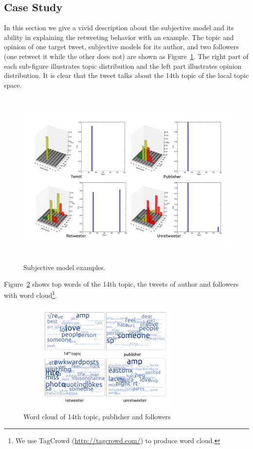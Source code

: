 \documentclass[letterpaper]{article}
\begin{document}
\subsection{Case Study}
\label{example}
In this section we give a vivid description about the subjective model and its ability in explaining the retweeting behavior with an example. 
The topic and opinion of one target tweet, subjective models for its author, and two followers (one retweet it while the other does not) are shown as Figure~\ref{fig2}. 
The right part of each sub-figure illustrates topic distribution and the left part illustrates opinion distribution. 
It is clear that the tweet talks about the 14th topic of the local topic space. 
\begin{figure}[htb]
\centering%
\includegraphics[width=6.0in,height=3.5in]{tweets10.pdf}
\caption{Subjective model examples.}
\label{fig2}
\end{figure}
Figure~\ref{fig3} shows top words of the 14th topic, the tweets of author and followers with word cloud\footnote{We use TagCrowd (\url{http://tagcrowd.com/}) to produce word cloud.}.
\begin{figure}[htb]
\centering
\includegraphics[width=3.5in,height=2.2in]{text_cloud.pdf}
\caption{Word cloud of 14th topic, publisher and followers}
\label{fig3}
\end{figure}
\end{document}
